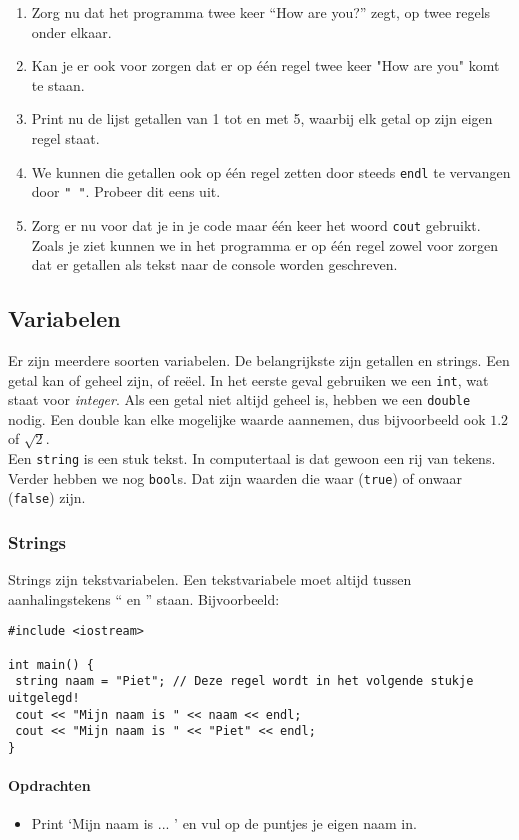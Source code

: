 \documentclass[12pt,a4paper]{article}
\newcommand{\icode}{\lstinline}
\begin{document}
\begin{enumerate}
		\item
			Zorg nu dat het programma twee keer ``How are you?'' zegt, op twee regels onder elkaar.
		\item
			Kan je er ook voor zorgen dat er op \'e\'en regel twee keer "How are you" komt te staan.
		\item
			Print nu de lijst getallen van 1 tot en met 5, waarbij elk getal op zijn eigen regel staat.
		\item
			We kunnen die getallen ook op \'e\'en regel zetten door steeds \icode{endl} te vervangen door \icode{" "}. Probeer dit eens uit.
		\item
			Zorg er nu voor dat je in je code maar \'e\'en keer het woord \icode{cout} gebruikt.
			Zoals je ziet kunnen we in het programma er op \'e\'en regel zowel voor zorgen dat er getallen als tekst naar de console worden geschreven. 
\end{enumerate}

\subsection{Variabelen}
Er zijn meerdere soorten variabelen. De belangrijkste zijn getallen en strings. Een getal kan of geheel zijn, of re\"eel. In het eerste geval gebruiken we een \icode{int}, wat staat voor \emph{integer}. Als een getal niet altijd geheel is, hebben we een \icode{double} nodig. Een double kan elke mogelijke waarde aannemen, dus bijvoorbeeld ook $1.2$ of $\sqrt 2$.\\
Een \icode{string} is een stuk tekst. In computertaal is dat gewoon een rij van tekens. Verder hebben we nog \icode{bool}s. Dat zijn waarden die waar (\icode{true}) of onwaar (\icode{false}) zijn.

\subsubsection{Strings}

Strings zijn tekstvariabelen. Een tekstvariabele moet altijd tussen aanhalingstekens `` en '' staan. 
Bijvoorbeeld: 

\begin{lstlisting}
#include <iostream> 

int main() {
 string naam = "Piet"; // Deze regel wordt in het volgende stukje uitgelegd! 
 cout << "Mijn naam is " << naam << endl;
 cout << "Mijn naam is " << "Piet" << endl; 
}
\end{lstlisting}

\paragraph{Opdrachten}
\begin{itemize} 
\item 
Print `Mijn naam is ... ' en vul op de puntjes je eigen naam in. 
\end{itemize} 
\end{document}
